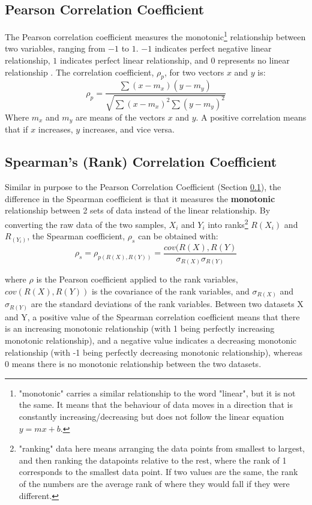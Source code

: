 \documentclass[a4paper, 10pt, conference]{ieeeconf}      %
\begin{document}
\subsection{Pearson Correlation Coefficient}\label{Pearson}
The Pearson correlation coefficient measures the monotonic\footnote{"monotonic" carries a similar relationship to the word "linear", but it is not the same. It means that the behaviour of data moves in a direction that is constantly increasing/decreasing but does not follow the linear equation $y = mx + b$.} relationship between two variables, ranging from $-1$ to $1$. $-1$ indicates perfect negative linear relationship, $1$ indicates perfect linear relationship, and $0$ represents no  linear relationship \cite{Dowdy1983}. The correlation coefficient, $\rho_{p}$, for two vectors $x$ and $y$ is:
\begin{equation}
    \rho_{p} = \frac{\sum(x-m_x)(y-m_y)}{\sqrt{\sum(x-m_x)^2\sum(y-m_y)^2}}
\end{equation}
Where $m_x$ and $m_y$ are means of the vectors $x$ and $y$. A positive correlation means that if $x$ increases, $y$ increases, and vice versa.

\subsection{Spearman's (Rank) Correlation Coefficient}
Similar in purpose to the Pearson Correlation Coefficient (Section \ref{Pearson}), the difference in the Spearman coefficient is that it measures the \textbf{monotonic} relationship between 2 sets of data instead of the linear relationship. By converting the raw data of the two samples, $X_i$ and $Y_i$ into ranks\footnote{"ranking" data here means arranging the data points from smallest to largest, and then ranking the datapoints relative to the rest, where the rank of 1 corresponds to the smallest data point. If two values are the same, the rank of the numbers are the average rank of where they would fall if they were different.} $R(X_i)$ and $R_(Y_i)$, the Spearman coefficient, $\rho_s$ can be obtained with:
\begin{equation}
    \rho_s = \rho_{p(R(X), R(Y))} = \frac{cov(R(X), R(Y)}{\sigma_{R(X)}\sigma_{R(Y)}}
\end{equation}

where $\rho$ is the Pearson coefficient applied to the rank variables, $cov(R(X), R(Y))$ is the covariance of the rank variables, and $\sigma_{R(X)}$ and $\sigma_{R(Y)}$ are the standard deviations of the rank variables. Between two datasets X and Y, a positive value of the Spearman correlation coefficient means that there is an increasing monotonic relationship (with 1 being perfectly increasing monotonic relationship), and a negative value indicates a decreasing monotonic relationship (with -1 being perfectly decreasing monotonic relationship), whereas 0 means there is no monotonic relationship between the two datasets. 
 
\end{document}
